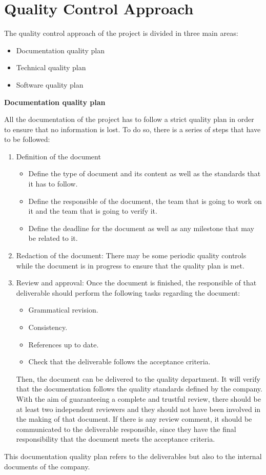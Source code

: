 \section{Quality Control Approach}

The quality control approach of the project is divided in three main areas:
\begin{itemize}
	\item Documentation quality plan
	\item Technical quality plan
	\item Software quality plan
\end{itemize}

\textbf{Documentation quality plan}

All the documentation of the project has to follow a strict quality plan in order to ensure that no information is lost. To do so, there is a series of steps that have to be followed:
\begin{enumerate}
	\item Definition of the document
	\begin{itemize}
		\item Define the type of document and its content as well as the standards that it has to follow.
		\item Define the responsible of the document, the team that is going to work on it and the team that is going to verify it.
		\item Define the deadline for the document as well as any milestone that may be related to it.
	\end{itemize}
	\item Redaction of the document: There may be some periodic quality controls while the document is in progress to ensure that the quality plan is met.
	\item Review and approval: Once the document is finished, the responsible of that deliverable should perform the following tasks regarding the document:
	\begin{itemize}
		\item Grammatical revision.
		\item Consistency.
		\item References up to date.
		\item Check that the deliverable follows the acceptance criteria.
	\end{itemize}
	Then, the document can be delivered to the quality department. It will verify that the documentation follows the quality standards defined by the company. With the aim of guaranteeing a complete and trustful review, there should be at least two independent reviewers and they should not have been involved in the making of that document.
	If there is any review comment, it should be communicated to the deliverable responsible, since they have the final responsibility that the document meets the acceptance criteria.
\end{enumerate}
This documentation quality plan refers to the deliverables but also to the internal documents of the company.

